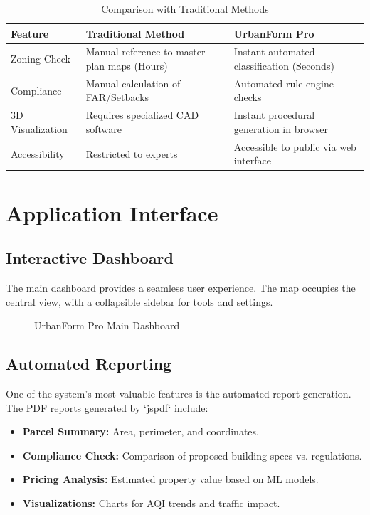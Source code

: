 \documentclass[12pt,a4paper]{report}
\begin{document}
\begin{table}[h]
    \centering
    \begin{tabular}{|l|p{4cm}|p{4cm}|}
        \hline
        \textbf{Feature} & \textbf{Traditional Method} & \textbf{UrbanForm Pro} \\
        \hline
        Zoning Check & Manual reference to master plan maps (Hours) & Instant automated classification (Seconds) \\
        \hline
        Compliance & Manual calculation of FAR/Setbacks & Automated rule engine checks \\
        \hline
        3D Visualization & Requires specialized CAD software & Instant procedural generation in browser \\
        \hline
        Accessibility & Restricted to experts & Accessible to public via web interface \\
        \hline
    \end{tabular}
    \caption{Comparison with Traditional Methods}
    \label{tab:comparison}
\end{table}

\section{Application Interface}

\subsection{Interactive Dashboard}
The main dashboard provides a seamless user experience. The map occupies the central view, with a collapsible sidebar for tools and settings.
\begin{figure}[H]
  \centering
  \caption{UrbanForm Pro Main Dashboard}
  \label{fig:dashboard}
\end{figure}

\subsection{Automated Reporting}
One of the system's most valuable features is the automated report generation. The PDF reports generated by `jspdf` include:
\begin{itemize}
    \item \textbf{Parcel Summary:} Area, perimeter, and coordinates.
    \item \textbf{Compliance Check:} Comparison of proposed building specs vs. regulations.
    \item \textbf{Pricing Analysis:} Estimated property value based on ML models.
    \item \textbf{Visualizations:} Charts for AQI trends and traffic impact.
\end{itemize}
\end{document}
